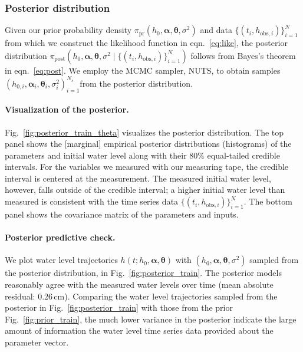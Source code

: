 \documentclass[openacc]{rsproca_new}%
\newcommand\thedata {$\{(t_i,h_{\text{obs}, i})\}_{i=1}^{N}$\xspace}
\newcommand\thedatanomath {\{(t_i,h_{\text{obs}, i})\}_{i=1}^{N}}
\newcommand\themodel {$h(t; h_0, \boldsymbol \alpha, \boldsymbol\theta)$\xspace}
\newcommand\thevars{h_0, \boldsymbol \alpha, \boldsymbol \theta, \sigma^2}
\newcommand\thesamples{$(h_{0, i}, \boldsymbol \alpha_i, \boldsymbol \theta_i, \sigma_i^2)_{i=1}^{N_s}$}
\begin{document}
\subsubsection{Posterior distribution}
Given our prior probability density $\pi_{\text{pr}}(h_0, \boldsymbol \alpha, \boldsymbol \theta, \sigma^2)$ and data \thedata from which we construct the likelihood function in eqn.~\ref{eq:like}, the posterior distribution $\pi_{\text{post}}(h_0, \boldsymbol \alpha, \boldsymbol \theta, \sigma^2 \mid \thedatanomath)$ follows from Bayes's theorem in eqn.~\ref{eq:post}. 
We employ the MCMC sampler, NUTS, to obtain samples \thesamples from the posterior distribution. 


\paragraph{Visualization of the posterior.}Fig.~\ref{fig:posterior_train_theta} visualizes the posterior distribution. 
The top panel shows the [marginal] empirical posterior distributions (histograms) of the parameters and initial water level along with their 80\% equal-tailed credible intervals. 
For the variables we measured with our measuring tape, the credible interval is centered at the measurement. 
The measured initial water level, however, falls outside of the credible interval; a higher initial water level than measured is consistent with the time series data \thedata.
The bottom panel shows the covariance matrix of the parameters and inputs. 


\paragraph{Posterior predictive check.} We plot water level trajectories \themodel with $(\thevars)$ sampled from the posterior distribution, in Fig.~\ref{fig:posterior_train}. 
The posterior models reasonably agree with the measured water levels over time (mean absolute residual: 0.26\,cm). 
Comparing the water level trajectories sampled from the posterior in Fig.~\ref{fig:posterior_train} with those from the prior Fig.~\ref{fig:prior_train}, the much lower variance in the posterior indicate the large amount of information the water level time series data provided about the parameter vector.
\end{document}
